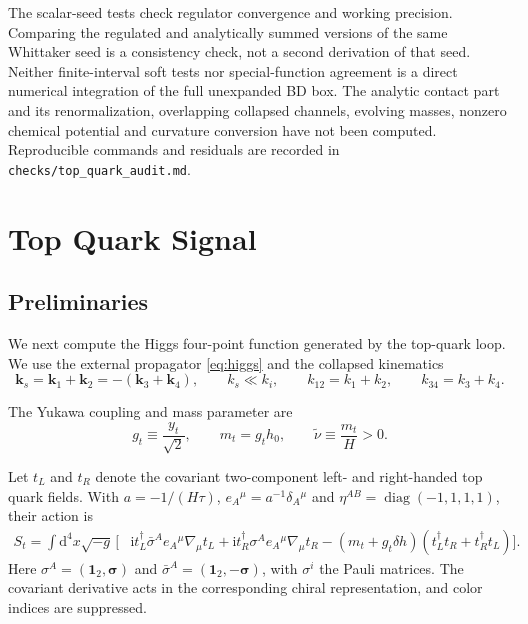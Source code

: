 \documentclass[a4paper,12pt]{article}
\newcommand{\ii}{\mathrm i}
\newcommand{\mb}{\mathbf}
\newcommand{\tn}{\tilde\nu}
\newcommand{\di}{\mathrm d}
\begin{document}
The scalar-seed tests check regulator convergence and working precision.
Comparing the regulated and analytically summed versions of the same
Whittaker seed is a consistency check, not a second derivation of that seed.
Neither finite-interval soft tests nor special-function agreement is
a direct numerical integration of the full unexpanded BD box.
The analytic contact part and its renormalization, overlapping collapsed
channels, evolving masses, nonzero chemical potential and curvature
conversion have not been computed. Reproducible commands and residuals
are recorded in \texttt{checks/top\_quark\_audit.md}.
\clearpage
\section{Top Quark Signal}
\label{sec:dirac-top}

\subsection{Preliminaries}
\label{sec:dirac-action}
We next compute the Higgs four-point function generated by the top-quark
loop. We use the external propagator \eqref{eq:higgs} and the collapsed
kinematics
\begin{equation}
 \mb k_s=\mb k_1+\mb k_2=-(\mb k_3+\mb k_4),\qquad
 k_s\ll k_i,\qquad k_{12}=k_1+k_2,\qquad k_{34}=k_3+k_4.
 \label{eq:dirac-collapsed-kinematics}
\end{equation}

The Yukawa coupling and mass parameter are
\begin{equation}
 g_t\equiv\frac{y_t}{\sqrt2},\qquad m_t=g_th_0,\qquad
 \tn\equiv\frac{m_t}{H}>0.
 \label{eq:dirac-parameters}
\end{equation}

Let $t_L$ and $t_R$ denote the covariant two-component left- and
right-handed top quark fields. With $a=-1/(H\tau)$,
$e_A{}^\mu=a^{-1}\delta_A{}^\mu$ and
$\eta^{AB}=\operatorname{diag}(-1,1,1,1)$, their action is
\begin{align}
 S_t=\int\di^4x\sqrt{-g}\,\Big[&
 \ii t_L^\dagger\bar\sigma^Ae_A{}^\mu\nabla_\mu t_L
 +\ii t_R^\dagger\sigma^Ae_A{}^\mu\nabla_\mu t_R-(m_t+g_t\delta h)
 (t_L^\dagger t_R+t_R^\dagger t_L)\Big].
 \label{eq:dirac-chiral-action}
\end{align}
Here $\sigma^A=(\mathbf1_2,\bm\sigma)$ and
$\bar\sigma^A=(\mathbf1_2,-\bm\sigma)$, with $\sigma^i$ the Pauli
matrices. The covariant derivative acts in the corresponding chiral
representation, and color indices are suppressed.
\end{document}
